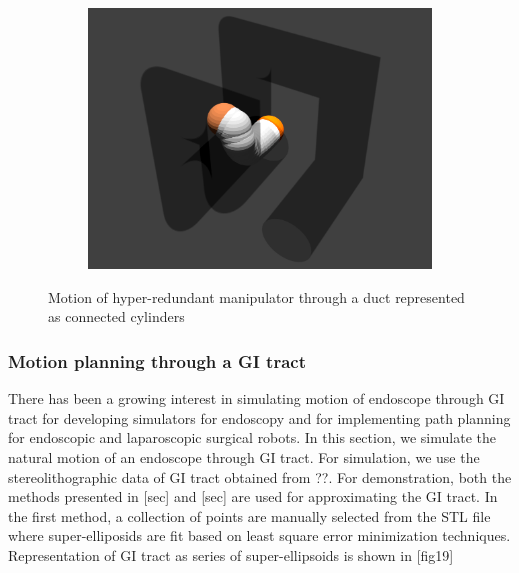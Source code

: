 \documentclass[12pt,a4]{article}
\begin{document}
\begin{figure}[ht!]
\begin{subfigure}{0.31\textwidth}
    \end{subfigure}%
    ~
        \begin{subfigure}{0.31\textwidth}
        \centering
        \includegraphics[width=0.8\linewidth]{figures/Pipesnaps/6.png}
        
    \end{subfigure}%
    
    \caption{ Motion of hyper-redundant manipulator through a duct represented as connected cylinders\label{fig:pipelinemotion}}
\end{figure}


\subsubsection{Motion planning through a GI tract}
There has been a growing interest in simulating motion of endoscope through GI tract for developing simulators for endoscopy and for implementing path planning for endoscopic and laparoscopic surgical robots. In this section, we simulate the natural motion of an endoscope through GI tract. For simulation, we use the stereolithographic data of GI tract obtained from ??. For demonstration, both the methods presented in [sec] and [sec] are used for approximating the GI tract. In the first method, a collection of points are manually selected from the STL file where super-elliposids are fit based on least square error minimization techniques. Representation of GI tract as series of super-ellipsoids is shown in [fig19]
\end{document}

